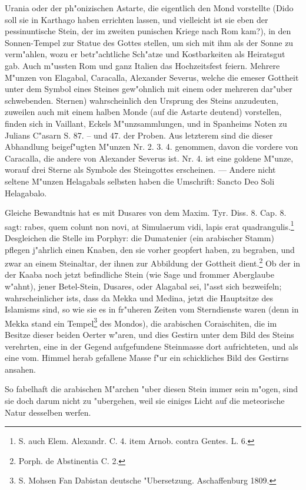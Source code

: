 \documentclass[a4paper, 11pt, oneside, polutonikogreek, german]{article}
\begin{document}
Urania oder der ph"onizischen Astarte, die eigentlich den Mond vorstellte (Dido soll sie in Karthago haben errichten lassen, und vielleicht ist sie eben der pessinuntische Stein, der im zweiten punischen Kriege nach Rom kam?), in den Sonnen-Tempel zur Statue des Gottes stellen, um sich mit ihm als der Sonne zu verm"ahlen, wozu er betr"achtliche Sch"atze und Kostbarkeiten als Heiratsgut gab. Auch m"ussten Rom und ganz Italien das Hochzeitsfest feiern. Mehrere M"unzen von Elagabal, Caracalla, Alexander Severus, welche die emeser Gottheit unter dem Symbol eines Steines gew"ohnlich mit einem oder mehreren dar"uber schwebenden. Sternen) wahrscheinlich den Ursprung des Steins anzudeuten, zuweilen auch mit einem halben Monde (auf die Astarte deutend) vorstellen, finden sich in Vaillant, Eckels M"unzsammlungen, und in Spanheims Noten zu Julians C"asarn S. 87. -- und 47. der Proben. Aus letzterem sind die dieser Abhandlung beigef"ugten M"unzen Nr. 2. 3. 4. genommen, davon die vordere von Caracalla, die andere von Alexander Severus ist. Nr. 4. ist eine goldene M"unze, worauf drei Sterne als Symbole des Steingottes erscheinen. --- Andere nicht seltene M"unzen Helagabals selbsten haben die Umschrift: Sancto Deo Soli Helagabalo.

Gleiche Bewandtnis hat es mit Dusares von dem Maxim. Tyr. Diss. 8. Cap. 8. sagt: rabes, quem colunt non novi, at Simulaerum vidi, lapis erat quadrangulis.\footnote{S. auch Elem. Alexandr. C. 4. item Arnob. contra Gentes. L. 6.} Desgleichen die Stelle im Porphyr: die Dumatenier (ein arabischer Stamm) pflegen j"ahrlich einen Knaben, den sie vorher geopfert haben, zu begraben, und zwar an einem Steinaltar, der ihnen zur Abbildung der Gottheit dient.\footnote{Porph. de Abstinentia C. 2.} Ob der in der Kaaba noch jetzt befindliche Stein (wie Sage und frommer Aberglaube w"ahnt), jener Betel-Stein, Dusares, oder Alagabal sei, l"asst sich bezweifeln; wahrscheinlicher ists, dass da Mekka und Medina, jetzt die Hauptsitze des Islamisms sind, so wie sie es in fr"uheren Zeiten vom Sterndienste waren (denn in Mekka stand ein Tempel\footnote{S. Mohsen Fan Dabistan deutsche "Ubersetzung. Aschaffenburg 1809.} des Mondos), die arabischen Coraischiten, die im Besitze dieser beiden Oerter w"aren, und dies Gestirn unter dem Bild des Steins verehrten, eine in der Gegend aufgefundene Steinmasse dort aufrichteten, und als eine vom. Himmel herab gefallene Masse f"ur ein schickliches Bild des Gestirns ansahen.

So fabelhaft die arabischen M"archen "uber diesen Stein immer sein m"ogen, sind sie doch darum nicht zu "ubergehen, weil sie einiges Licht auf die meteorische Natur desselben werfen.
\end{document}
